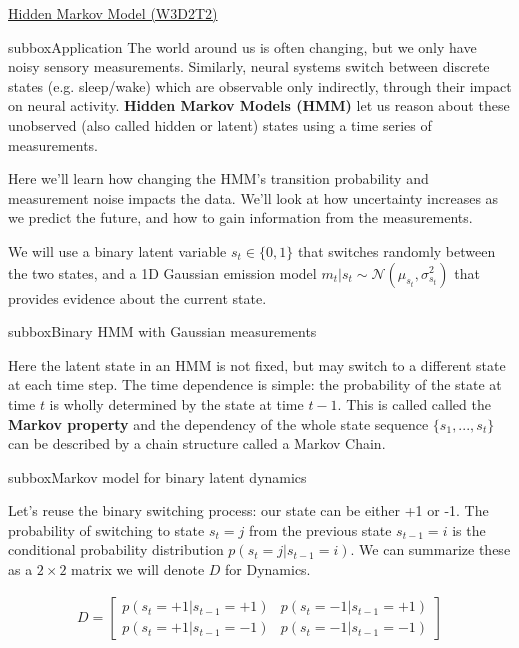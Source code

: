 \begin{textbox}{\href{http://instructor.compneuro.neuromatch.io/tutorials/W3D2_HiddenDynamics/instructor/W3D2_Tutorial2.html}{Hidden Markov Model (W3D2T2)}   }

\begin{subbox}{subbox}{Application}
\scriptsize
The world around us is often changing, but we only have noisy sensory measurements. Similarly, neural systems switch between discrete states (e.g. sleep/wake) which are observable only indirectly, through their impact on neural activity. \textbf{Hidden Markov Models (HMM)} let us reason about these unobserved (also called hidden or latent) states using a time series of measurements. 

Here we'll learn how changing the HMM's transition probability and measurement noise impacts the data. We'll look at how uncertainty increases as we predict the future, and how to gain information from the measurements.

We will use a binary latent variable $s_t \in \{0,1\}$ that switches randomly between the two states, and a 1D Gaussian emission model $m_t|s_t \sim \mathcal{N}(\mu_{s_t},\sigma^2_{s_t})$ that provides evidence about the current state.

\end{subbox}
\begin{subbox}{subbox}{Binary HMM with Gaussian measurements}
\scriptsize

Here the latent state in an HMM is not fixed, but may switch to a different state at each time step. The time dependence is simple: the probability of the state at time $t$ is wholly determined by the state at time $t-1$. This is called called the \textbf{Markov property} and the dependency of the whole state sequence $\{s_1,...,s_t\}$ can be described by a chain structure called a Markov Chain. 

\end{subbox}
\begin{subbox}{subbox}{Markov model for binary latent dynamics}
\scriptsize

Let's reuse the binary switching process: our state can be either +1 or -1. The probability of switching to state $s_t=j$ from the previous state $s_{t-1}=i$ is the conditional probability distribution $p(s_t = j| s_{t-1} = i)$. We can summarize these as a $2\times 2$ matrix we will denote $D$ for Dynamics.

\begin{align*}
D = \begin{bmatrix}p(s_t = +1 | s_{t-1} = +1) & p(s_t = -1 | s_{t-1} = +1)\\p(s_t = +1 | s_{t-1} = -1)& p(s_t = -1 | s_{t-1} = -1)\end{bmatrix}
\end{align*}


\end{subbox}
\end{textbox}
